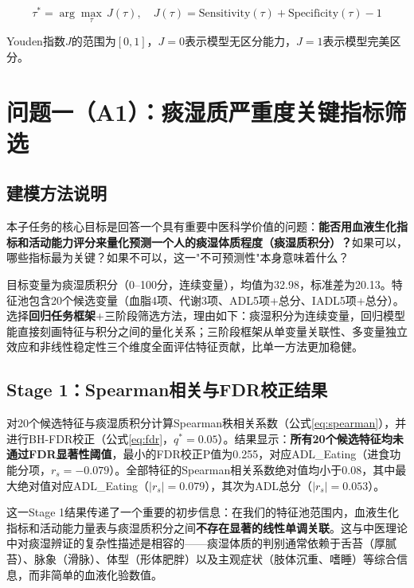 \documentclass[12pt,a4paper]{ctexart}
\begin{document}
\begin{equation}
\tau^* = \arg\max_{\tau}\,J(\tau), \quad J(\tau) = \text{Sensitivity}(\tau) + \text{Specificity}(\tau) - 1
\label{eq:youden}
\end{equation}

Youden指数$J$的范围为$[0, 1]$，$J = 0$表示模型无区分能力，$J = 1$表示模型完美区分。


\section{问题一（A1）：痰湿质严重度关键指标筛选}

\subsection{建模方法说明}

本子任务的核心目标是回答一个具有重要中医科学价值的问题：\textbf{能否用血液生化指标和活动能力评分来量化预测一个人的痰湿体质程度（痰湿质积分）？}如果可以，哪些指标最为关键？如果不可以，这一"不可预测性"本身意味着什么？

目标变量为痰湿质积分（0--100分，连续变量），均值为32.98，标准差为20.13。特征池包含20个候选变量（血脂4项、代谢3项、ADL5项+总分、IADL5项+总分）。选择\textbf{回归任务框架}+三阶段筛选方法，理由如下：痰湿积分为连续变量，回归模型能直接刻画特征与积分之间的量化关系；三阶段框架从单变量关联性、多变量独立效应和非线性稳定性三个维度全面评估特征贡献，比单一方法更加稳健。

\subsection{Stage 1：Spearman相关与FDR校正结果}

对20个候选特征与痰湿质积分计算Spearman秩相关系数（公式\ref{eq:spearman}），并进行BH-FDR校正（公式\ref{eq:fdr}，$q^* = 0.05$）。结果显示：\textbf{所有20个候选特征均未通过FDR显著性阈值}，最小的FDR校正P值为0.255，对应ADL\_Eating（进食功能分项，$r_s = -0.079$）。全部特征的Spearman相关系数绝对值均小于0.08，其中最大绝对值对应ADL\_Eating（$|r_s| = 0.079$），其次为ADL总分（$|r_s| = 0.053$）。

这一Stage 1结果传递了一个重要的初步信息：在我们的特征池范围内，血液生化指标和活动能力量表与痰湿质积分之间\textbf{不存在显著的线性单调关联}。这与中医理论中对痰湿辨证的复杂性描述是相容的——痰湿体质的判别通常依赖于舌苔（厚腻苔）、脉象（滑脉）、体型（形体肥胖）以及主观症状（肢体沉重、嗜睡）等综合信息，而非简单的血液化验数值。
\end{document}
